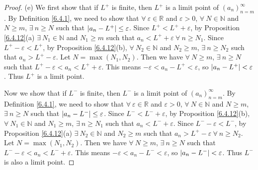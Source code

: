 \begin{proof}{(e)}
We first show that if \(L^+\) is finite, then \(L^+\) is a limit point of \((a_n)_{n = m}^\infty\).
By Definition \ref{6.4.1}, we need to show that \(\forall\ \varepsilon \in \mathds{R}\) and \(\varepsilon > 0\), \(\forall\ N \in \mathds{N}\) and \(N \geq m\), \(\exists\ n \geq N\) such that \(\abs*{a_n - L^+} \leq \varepsilon\).
Since \(L^+ < L^+ + \varepsilon\), by Proposition \ref{6.4.12}(a) \(\exists\ N_1 \in \mathds{N}\) and \(N_1 \geq m\) such that \(a_n < L^+ + \varepsilon \ \forall\ n \geq N_1\).
Since \(L^+ - \varepsilon < L^+\), by Proposition \ref{6.4.12}(b), \(\forall\ N_2 \in \mathds{N}\) and \(N_2 \geq m\), \(\exists\ n \geq N_2\) such that \(a_n > L^+ - \varepsilon\).
Let \(N = \max(N_1, N_2)\).
Then we have \(\forall\ N \geq m\), \(\exists\ n \geq N\) such that \(L^+ - \varepsilon < a_n < L^+ + \varepsilon\).
This means \(-\varepsilon < a_n - L^+ < \varepsilon\), so \(\abs*{a_n - L^+} < \varepsilon\).
Thus \(L^+\) is a limit point.

Now we show that if \(L^-\) is finite, then \(L^-\) is a limit point of \((a_n)_{n = m}^\infty\).
By Definition \ref{6.4.1}, we need to show that \(\forall\ \varepsilon \in \mathds{R}\) and \(\varepsilon > 0\), \(\forall\ N \in \mathds{N}\) and \(N \geq m\), \(\exists\ n \geq N\) such that \(\abs*{a_n - L^-} \leq \varepsilon\).
Since \(L^- < L^- + \varepsilon\), by Proposition \ref{6.4.12}(b), \(\forall\ N_1 \in \mathds{N}\) and \(N_1 \geq m\), \(\exists\ n \geq N_1\) such that \(a_n < L^- + \varepsilon\).
Since \(L^- - \varepsilon < L^-\), by Proposition \ref{6.4.12}(a) \(\exists\ N_2 \in \mathds{N}\) and \(N_2 \geq m\) such that \(a_n > L^+ - \varepsilon \ \forall\ n \geq N_2\).
Let \(N = \max(N_1, N_2)\).
Then we have \(\forall\ N \geq m\), \(\exists\ n \geq N\) such that \(L^- - \varepsilon < a_n < L^- + \varepsilon\).
This means \(-\varepsilon < a_n - L^- < \varepsilon\), so \(\abs*{a_n - L^-} < \varepsilon\).
Thus \(L^-\) is also a limit point.
\end{proof}

